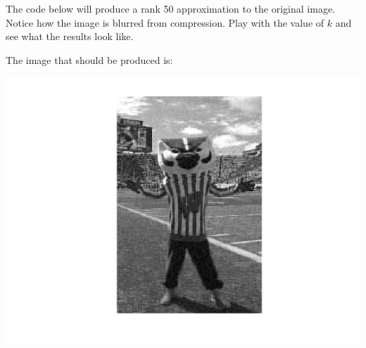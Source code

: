 The code below will produce a rank 50 approximation to the original image. Notice how the image is blurred from compression. Play with the value of $k$ and see what the results look like.


The image that should be produced is:

\includegraphics[scale=0.75]{../Report/bucky50.png}